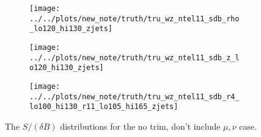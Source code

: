 \begin{figure}[!htbp]\captionsetup{justification=centering}
\begin{center}
\begin{subfigure}[t]{18pc}\centering\texttt{[image: ../../plots/new\_note/truth/tru\_wz\_ntel11\_sdb\_rho\_lo120\_hi130\_zjets]}\caption{}\end{subfigure}
\begin{subfigure}[t]{18pc}\centering\texttt{[image: ../../plots/new\_note/truth/tru\_wz\_ntel11\_sdb\_z\_lo120\_hi130\_zjets]}\caption{}\end{subfigure}
\begin{subfigure}[t]{18pc}\centering\texttt{[image: ../../plots/new\_note/truth/tru\_wz\_ntel11\_sdb\_r4\_lo100\_hi130\_r11\_lo105\_hi165\_zjets]}\caption{}\end{subfigure}
\caption{\label{fig:mbbwz}The $S/(\delta B)$ distributions for the no trim, don't include $\mu,\nu$ case.}
\end{center}
\end{figure}


